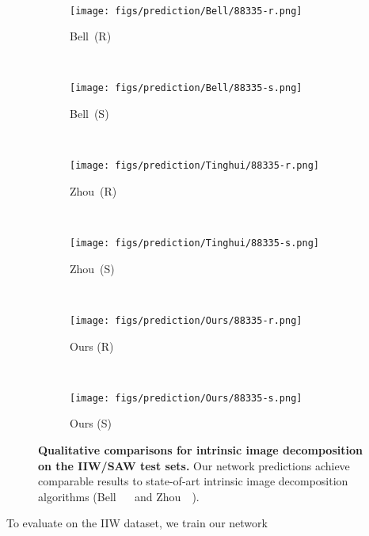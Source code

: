 \documentclass[10pt,twocolumn,letterpaper]{article}
\begin{document}
\begin{figure*}[ptb]
    ~
    \begin{subfigure}[b]{0.135\textwidth}
        \texttt{[image: figs/prediction/Bell/88335-r.png]}
         \caption{Bell~\etal (R)}  \vspace{-0.1em}
    \end{subfigure} \hspace*{-0.8em}
    ~
    \begin{subfigure}[b]{0.135\textwidth}
        \texttt{[image: figs/prediction/Bell/88335-s.png]}
		\caption{Bell~\etal (S)}  \vspace{-0.1em}
    \end{subfigure} \hspace*{-0.8em}
    ~
    \begin{subfigure}[b]{0.135\textwidth}
        \texttt{[image: figs/prediction/Tinghui/88335-r.png]}
	\caption{Zhou~\etal (R)}  \vspace{-0.1em}
    \end{subfigure} \hspace*{-0.8em} 
    ~    
    \begin{subfigure}[b]{0.135\textwidth}
        \texttt{[image: figs/prediction/Tinghui/88335-s.png]}
    \caption{Zhou~\etal (S)}  \vspace{-0.1em}
    \end{subfigure}   \hspace*{-0.8em}
    ~
    \begin{subfigure}[b]{0.135\textwidth}
        \texttt{[image: figs/prediction/Ours/88335-r.png]}
    \caption{Ours (R)}  \vspace{-0.1em}
    \end{subfigure}   \hspace*{-0.8em}
    ~    
    \begin{subfigure}[b]{0.135\textwidth}
        \texttt{[image: figs/prediction/Ours/88335-s.png]}
    \caption{Ours (S)}  \vspace{-0.1em}
    \end{subfigure}  
    
  	\caption{\textbf{Qualitative comparisons for intrinsic image
            decomposition on the IIW/SAW test sets.} Our network
          predictions achieve comparable results to state-of-art
          intrinsic image decomposition algorithms (Bell~\etal
          ~\cite{bell2014intrinsic} and
          Zhou~\etal~\cite{zhou2015learning}).  \label{fig:visual_compare}}
        \vspace{-0.1em}%
\end{figure*}To evaluate on the IIW dataset, we train our network
\end{document}
